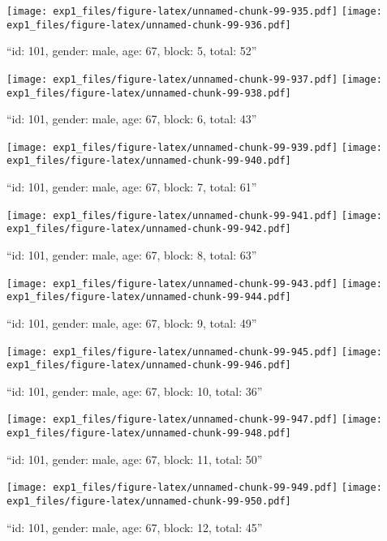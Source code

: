 \documentclass[,]{article}
\begin{document}
\texttt{[image: exp1\_files/figure-latex/unnamed-chunk-99-935.pdf]}
\texttt{[image: exp1\_files/figure-latex/unnamed-chunk-99-936.pdf]}

\newpage
[1] 

``id: 101, gender: male, age: 67, block: 5, total: 52''

\texttt{[image: exp1\_files/figure-latex/unnamed-chunk-99-937.pdf]}
\texttt{[image: exp1\_files/figure-latex/unnamed-chunk-99-938.pdf]}

\newpage
[1] 

``id: 101, gender: male, age: 67, block: 6, total: 43''

\texttt{[image: exp1\_files/figure-latex/unnamed-chunk-99-939.pdf]}
\texttt{[image: exp1\_files/figure-latex/unnamed-chunk-99-940.pdf]}

\newpage
[1] 

``id: 101, gender: male, age: 67, block: 7, total: 61''

\texttt{[image: exp1\_files/figure-latex/unnamed-chunk-99-941.pdf]}
\texttt{[image: exp1\_files/figure-latex/unnamed-chunk-99-942.pdf]}

\newpage
[1] 

``id: 101, gender: male, age: 67, block: 8, total: 63''

\texttt{[image: exp1\_files/figure-latex/unnamed-chunk-99-943.pdf]}
\texttt{[image: exp1\_files/figure-latex/unnamed-chunk-99-944.pdf]}

\newpage
[1] 

``id: 101, gender: male, age: 67, block: 9, total: 49''

\texttt{[image: exp1\_files/figure-latex/unnamed-chunk-99-945.pdf]}
\texttt{[image: exp1\_files/figure-latex/unnamed-chunk-99-946.pdf]}

\newpage
[1] 

``id: 101, gender: male, age: 67, block: 10, total: 36''

\texttt{[image: exp1\_files/figure-latex/unnamed-chunk-99-947.pdf]}
\texttt{[image: exp1\_files/figure-latex/unnamed-chunk-99-948.pdf]}

\newpage
[1] 

``id: 101, gender: male, age: 67, block: 11, total: 50''

\texttt{[image: exp1\_files/figure-latex/unnamed-chunk-99-949.pdf]}
\texttt{[image: exp1\_files/figure-latex/unnamed-chunk-99-950.pdf]}

\newpage
[1] 

``id: 101, gender: male, age: 67, block: 12, total: 45''
\end{document}
